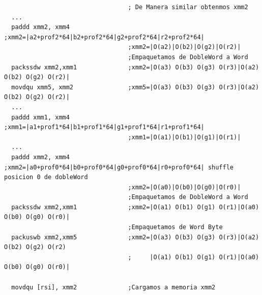 \begin{codesnippet}
\begin{verbatim}    
                                  ; De Manera similar obtenmos xmm2
  ...
  paddd xmm2, xmm4                ;xmm2=|a2+prof2*64|b2+prof2*64|g2+prof2*64|r2+prof2*64|
                                  ;xmm2=|O(a2)|O(b2)|O(g2)|O(r2)|	
                                  ;Empaquetamos de DobleWord a Word	
  packssdw xmm2,xmm1              ;xmm2=|O(a3) O(b3) O(g3) O(r3)|O(a2) O(b2) O(g2) O(r2)|
  movdqu xmm5, xmm2               ;xmm5=|O(a3) O(b3) O(g3) O(r3)|O(a2) O(b2) O(g2) O(r2)|
  ...
  paddd xmm1, xmm4                ;xmm1=|a1+prof1*64|b1+prof1*64|g1+prof1*64|r1+prof1*64|
                                  ;xmm1=|O(a1)|O(b1)|O(g1)|O(r1)|						
  ...
  paddd xmm2, xmm4                ;xmm2=|a0+prof0*64|b0+prof0*64|g0+prof0*64|r0+prof0*64| shuffle posicion 0 de dobleWord
                                  ;xmm2=|O(a0)|O(b0)|O(g0)|O(r0)|                   
                                  ;Empaquetamos de DobleWord a Word
  packssdw xmm2,xmm1              ;xmm2=|O(a1) O(b1) O(g1) O(r1)|O(a0) O(b0) O(g0) O(r0)|						
                                  ;Empaquetamos de Word Byte
  packuswb xmm2,xmm5              ;xmm2=|O(a3) O(b3) O(g3) O(r3)|O(a2) O(b2) O(g2) O(r2)
                                  ;     |O(a1) O(b1) O(g1) O(r1)|O(a0) O(b0) O(g0) O(r0)|                      

  movdqu [rsi], xmm2              ;Cargamos a memoria xmm2                        			
\end{verbatim}
\end{codesnippet}